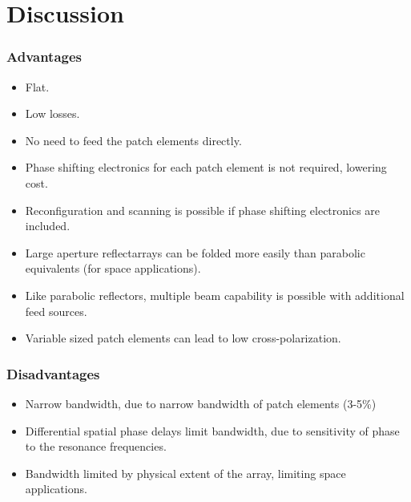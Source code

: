 
\section{Discussion}
\begin{frame}
\frametitle{Advantages}

\begin{itemize}
\item Flat.
\item Low losses.
\item No need to feed the patch elements directly.
\item Phase shifting electronics for each patch element is not required, lowering cost.
\item Reconfiguration and scanning is possible if phase shifting electronics are included.
\item Large aperture reflectarrays can be folded more easily than parabolic equivalents (for space applications).
\item Like parabolic reflectors, multiple beam capability is possible with additional feed sources.
\item Variable sized patch elements can lead to low cross-polarization.
\end{itemize}
\end{frame}

\begin{frame}
\frametitle{Disadvantages}

\begin{itemize}
\item Narrow bandwidth, due to narrow bandwidth of patch elements (3-5\%)
\item Differential spatial phase delays limit bandwidth, due to sensitivity of phase to the resonance frequencies.
\citep{pozar1997design}
\item Bandwidth limited by physical extent of the array, limiting space applications.
\citep{encinar2001design}
\end{itemize}
\end{frame}

